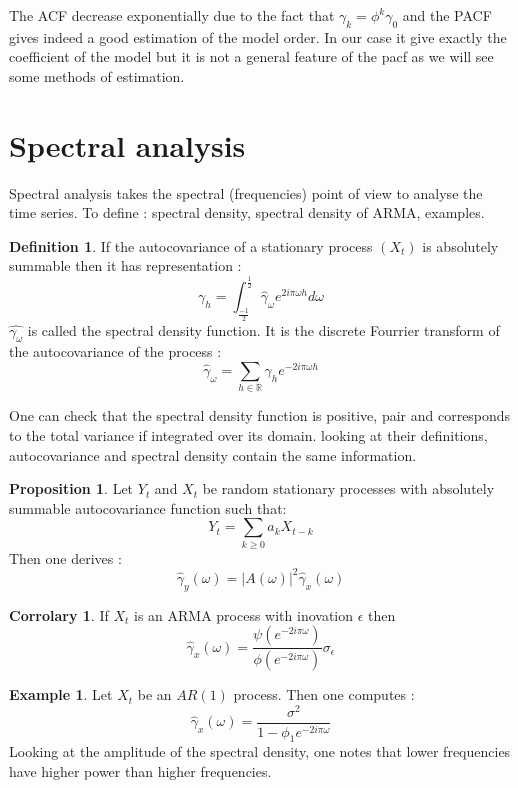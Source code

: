 \documentclass{article}
\theoremstyle{definition}
\newtheorem{Prop}{Proposition}[section]
\newtheorem{ex}{Example}[section]
\newtheorem{Def}{Definition}[section]
\newtheorem{Cor}{Corrolary}[section]
\begin{document}
The ACF decrease exponentially due to the fact that $\gamma_k=\phi^k\gamma_0$ and the PACF gives indeed a good estimation of the model order. In our case it give exactly the coefficient of the model but it is not a general feature of the pacf as we will see some methods of estimation.
\section{Spectral analysis}
Spectral analysis takes the spectral (frequencies) point of view to analyse the time series. To define : spectral density, spectral density of ARMA, examples.
\begin{Def}
If the autocovariance of a stationary process $(X_t)$ is absolutely summable then it has representation : \begin{equation*}
    \gamma_h=\int_{\frac{-1}{2}}^{\frac{1}{2}}\hat{\gamma}_{\omega}e^{2i\pi\omega h}d\omega
\end{equation*} 
$\hat{\gamma_{\omega}}$ is called the spectral density function. It is the discrete Fourrier transform of the autocovariance of the process : 
\begin{equation*}
    \hat{\gamma}_{\omega}=\sum_{h\in\mathbb{R}}\gamma_he^{-2i\pi\omega h}
\end{equation*}
\end{Def}
One can check that the spectral density function is positive, pair and corresponds to the total variance if integrated over its domain. looking at their definitions, autocovariance and spectral density contain the same information.
\begin{Prop}
Let $Y_t$ and $X_t$ be random stationary processes with absolutely summable autocovariance function such that: 
\begin{equation*}
    Y_t=\sum_{k\geq 0} a_kX_{t-k}
\end{equation*}
Then one derives :
\begin{equation*}
    \hat{\gamma}_y(\omega)=|A(\omega)|^2\hat{\gamma}_x(\omega)
\end{equation*}
\end{Prop}
\begin{Cor}
If $X_t$ is an ARMA process with inovation $\epsilon$ then \begin{equation*}
    \hat{\gamma}_x(\omega)=\frac{\psi(e^{-2i\pi\omega})}{\phi(e^{-2i\pi\omega})}\sigma_{\epsilon}
\end{equation*}
\end{Cor}
\begin{ex}
Let $X_t$ be an $AR(1)$ process. Then one computes : 
\begin{equation*}
    \hat{\gamma}_x(\omega)=\frac{\sigma^2}{1-\phi_1 e^{-2i\pi\omega}}
\end{equation*}
Looking at the amplitude of the spectral density, one notes that lower frequencies have higher power than higher frequencies. \end{ex}
\end{document}

